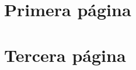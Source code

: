 \documentclass[12pt]{article}
\begin{document}
\thispagestyle{firstpage} %

\section*{Primera página}
\lipsum[1-3] %

\clearpage

\thispagestyle{secondpage} %

\begin{landscape} %
\lipsum[6-10] 
\end{landscape}
\clearpage



\thispagestyle{thirdpage} %

\section*{Tercera página}
\lipsum[11-12] %
\end{document}
